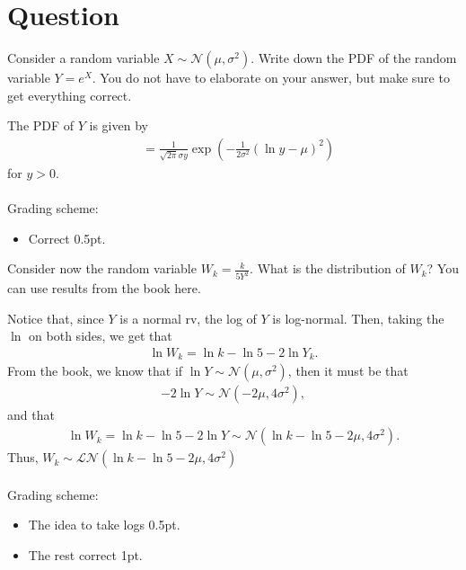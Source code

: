 \section{Question}

\begin{exercise}[0.5]
Consider a random variable $X\sim\mathcal{N}(\mu,\sigma^2)$. Write down the PDF of the random variable $Y=e^X$. You do not have to elaborate on your answer, but make sure to get everything correct.
\begin{solution}
The PDF of $Y$ is given by
\begin{align*}
    &= \frac{1}{\sqrt{2\pi}\sigma y}\exp{\left(-\frac{1}{2\sigma^2}(\ln{y}-\mu)^2\right)}
\end{align*}
for $y>0$.
\\\\
Grading scheme:
\begin{itemize}
    \item Correct 0.5pt.
\end{itemize}
\end{solution}
\end{exercise}

\begin{exercise}[1.5]
Consider now the random variable $W_k = \frac{k}{5Y^2}$. What is the distribution of $W_k$? You can use results from the book here.
\begin{solution}
Notice that, since $Y$ is a normal rv, the log of $Y$ is log-normal. Then, taking the $\ln$ on both sides, we get that
\begin{align*}
    \ln{W_k} = \ln{k}-\ln{5}-2\ln{Y_k}.
\end{align*}
From the book, we know that if $\ln{Y}\sim\mathcal{N}(\mu,\sigma^2)$, then it must be that
\begin{align*}
    -2\ln{Y}\sim\mathcal{N}(-2\mu, 4\sigma^2),
\end{align*}
and that
\begin{align*}
    \ln{W_k} = \ln{k}-\ln{5}-2\ln{Y}\sim\mathcal{N}(\ln{k}-\ln{5}-2\mu, 4\sigma^2).
\end{align*}
Thus, $W_k\sim\mathcal{L}\mathcal{N}(\ln{k}-\ln{5}-2\mu, 4\sigma^2)$
\\\\
Grading scheme:
\begin{itemize}
    \item The idea to take logs 0.5pt.
    \item The rest correct 1pt.
\end{itemize}
\end{solution}
\end{exercise}


